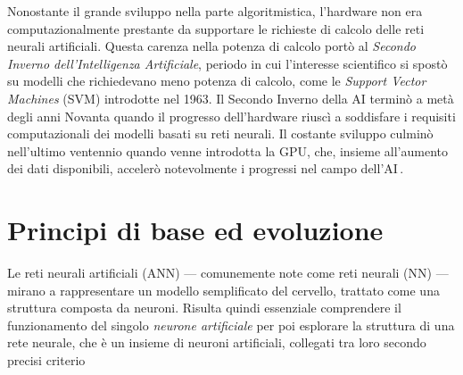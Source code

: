 Nonostante il grande sviluppo nella parte algoritmistica, l'hardware non era computazionalmente prestante da supportare le richieste di calcolo delle reti neurali artificiali. Questa carenza nella potenza di calcolo portò al \textsl{Secondo Inverno dell'Intelligenza Artificiale}, periodo in cui l'interesse scientifico si spostò su modelli che richiedevano meno potenza di calcolo, come le \textit{Support Vector Machines} (\acs{SVM}) introdotte nel 1963. Il Secondo Inverno della \acs{AI} terminò a metà degli anni Novanta quando il progresso dell'hardware riuscì a soddisfare i requisiti computazionali dei modelli basati su reti neurali. Il costante sviluppo culminò nell'ultimo ventennio quando venne introdotta la \acs{GPU}, che, insieme all'aumento dei dati disponibili, accelerò notevolmente i progressi nel campo dell'\acs{AI}\,\cite{flasinski2016introduction, muthukrishnan2020brief}.

\section{Principi di base ed evoluzione}
%
Le reti neurali artificiali (\acs{ANN}) — comunemente note come reti neurali (\acs{NN}) — mirano a rappresentare un modello semplificato del cervello, trattato come una struttura composta da neuroni. Risulta quindi essenziale comprendere il funzionamento del singolo \textsl{neurone artificiale} per poi esplorare la struttura di una rete neurale, che è un insieme di neuroni artificiali, collegati tra loro secondo precisi criterio


